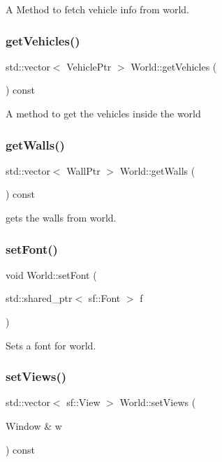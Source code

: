 A Method to fetch vehicle info from world. \hypertarget{classWorld_afa144f2f17a04087776721af7b225387}{}\label{classWorld_afa144f2f17a04087776721af7b225387} 
\subsubsection{\texorpdfstring{get\+Vehicles()}{getVehicles()}}
{\footnotesize\ttfamily std\+::vector$<$ Vehicle\+Ptr $>$ World\+::get\+Vehicles (\begin{DoxyParamCaption}{ }\end{DoxyParamCaption}) const}

A method to get the vehicles inside the world \hypertarget{classWorld_a2abd0169432b982782a77914bffd3fa0}{}\label{classWorld_a2abd0169432b982782a77914bffd3fa0} 
\subsubsection{\texorpdfstring{get\+Walls()}{getWalls()}}
{\footnotesize\ttfamily std\+::vector$<$ Wall\+Ptr $>$ World\+::get\+Walls (\begin{DoxyParamCaption}{ }\end{DoxyParamCaption}) const}

gets the walls from world. \hypertarget{classWorld_a1958eb9641efaa29bff034f4e076f10a}{}\label{classWorld_a1958eb9641efaa29bff034f4e076f10a} 
\subsubsection{\texorpdfstring{set\+Font()}{setFont()}}
{\footnotesize\ttfamily void World\+::set\+Font (\begin{DoxyParamCaption}\item[{std\+::shared\+\_\+ptr$<$ sf\+::\+Font $>$}]{f }\end{DoxyParamCaption})}

Sets a font for world. \hypertarget{classWorld_acc906e59c83bbed0da781ae9e4981d4c}{}\label{classWorld_acc906e59c83bbed0da781ae9e4981d4c} 
\subsubsection{\texorpdfstring{set\+Views()}{setViews()}}
{\footnotesize\ttfamily std\+::vector$<$ sf\+::\+View $>$ World\+::set\+Views (\begin{DoxyParamCaption}\item[{Window \&}]{w }\end{DoxyParamCaption}) const}

